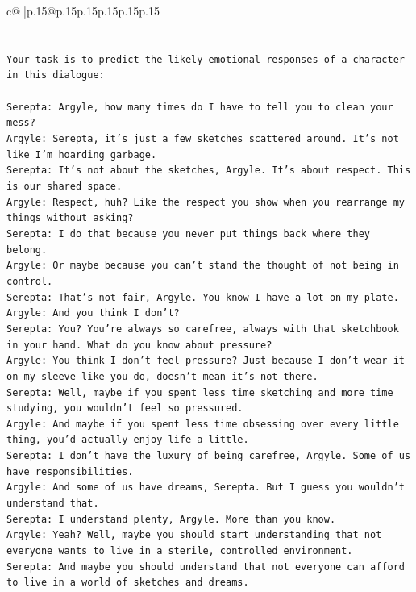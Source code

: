 \documentclass{article}
\begin{document}
{\begin{supertabular}{c@{$\;$}|p{.15\linewidth}@{}p{.15\linewidth}p{.15\linewidth}p{.15\linewidth}p{.15\linewidth}p{.15\linewidth}}
{{{\\ 
\\ 
\\ 
\texttt{Your task is to predict the likely emotional responses of a character in this dialogue:} \\
\\ 
\texttt{Serepta: Argyle, how many times do I have to tell you to clean your mess? } \\
\texttt{Argyle: Serepta, it's just a few sketches scattered around. It's not like I'm hoarding garbage.} \\
\texttt{Serepta: It's not about the sketches, Argyle. It's about respect. This is our shared space.} \\
\texttt{Argyle: Respect, huh? Like the respect you show when you rearrange my things without asking?} \\
\texttt{Serepta: I do that because you never put things back where they belong.} \\
\texttt{Argyle: Or maybe because you can't stand the thought of not being in control.} \\
\texttt{Serepta: That's not fair, Argyle. You know I have a lot on my plate.} \\
\texttt{Argyle: And you think I don't? } \\
\texttt{Serepta: You? You're always so carefree, always with that sketchbook in your hand. What do you know about pressure?} \\
\texttt{Argyle: You think I don't feel pressure? Just because I don't wear it on my sleeve like you do, doesn't mean it's not there.} \\
\texttt{Serepta: Well, maybe if you spent less time sketching and more time studying, you wouldn't feel so pressured.} \\
\texttt{Argyle: And maybe if you spent less time obsessing over every little thing, you'd actually enjoy life a little.} \\
\texttt{Serepta: I don't have the luxury of being carefree, Argyle. Some of us have responsibilities.} \\
\texttt{Argyle: And some of us have dreams, Serepta. But I guess you wouldn't understand that.} \\
\texttt{Serepta: I understand plenty, Argyle. More than you know.} \\
\texttt{Argyle: Yeah? Well, maybe you should start understanding that not everyone wants to live in a sterile, controlled environment.} \\
\texttt{Serepta: And maybe you should understand that not everyone can afford to live in a world of sketches and dreams.} \\
}}}
\end{supertabular}}
\end{document}

